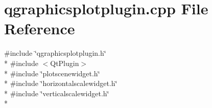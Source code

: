 \section{qgraphicsplotplugin.\+cpp File Reference}
\label{plugins_2qgraphicsplotplugin_8cpp}
{\ttfamily \#include \char`\"{}qgraphicsplotplugin.\+h\char`\"{}}\\*
{\ttfamily \#include $<$Qt\+Plugin$>$}\\*
{\ttfamily \#include \char`\"{}plotscenewidget.\+h\char`\"{}}\\*
{\ttfamily \#include \char`\"{}horizontalscalewidget.\+h\char`\"{}}\\*
{\ttfamily \#include \char`\"{}verticalscalewidget.\+h\char`\"{}}\\*

